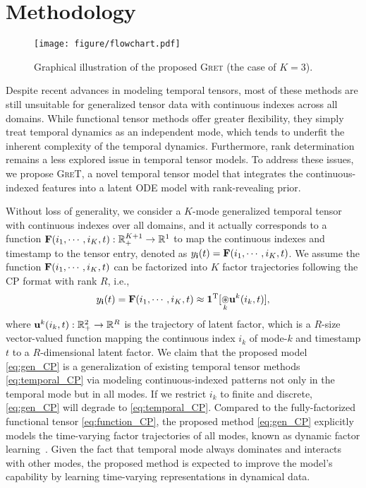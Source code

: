\section{Methodology}
\begin{figure*}
    \centering
    \texttt{[image: figure/flowchart.pdf]}
    \caption{Graphical illustration of the proposed \textsc{Gret} (the case of $K=3$).}
    \label{fig:flowchart}
    \vspace{-0.05in}
\end{figure*}
Despite recent advances in modeling temporal tensors, most of these methods are still unsuitable for generalized tensor data with continuous indexes across all domains. 
While functional tensor methods offer greater flexibility, they simply treat temporal dynamics as an independent mode, which tends to underfit the inherent complexity of the temporal dynamics.  Furthermore, rank determination remains a less explored issue in temporal tensor models.
To address these issues, we propose \textsc{GreT}, a novel temporal tensor model that integrates the continuous-indexed  features into a latent ODE  model with rank-revealing prior. 

Without loss of generality, we consider a $K$-mode generalized temporal tensor  with continuous indexes over all domains, and it actually corresponds to a function $\mathbf{F}(i_1, \cdots, i_K, t):\mathbb{R}_{+}^{K+1}\rightarrow \mathbb{R}^{1}$ to map the continuous indexes and timestamp to the tensor entry, denoted as $y_{\mathbf{i}}(t) = \mathbf{F}(i_1, \cdots, i_K, t)$. We assume the function $\mathbf{F}(i_1, \cdots, i_K, t)$ can be factorized into $K$  factor trajectories following the CP format with rank $R$, i.e., 
\vspace{-2mm}
\begin{equation}    
    y_{\mathbf{i}}(t) = \mathbf{F}(i_1, \cdots, i_K, t) \approx \boldsymbol{1}^{\mathrm{T}}[\underset{k}{\circledast}  \mathbf{u}^k(i_k, t)], \label{eq:gen_CP}
\end{equation}
where $\mathbf{u}^k(i_k, t):\mathbb{R}_{+}^{2}\rightarrow \mathbb{R}^{R}$  is the trajectory of latent factor, which is a $R$-size vector-valued function mapping the continuous index $i_k$ of mode-$k$ and timestamp $t$ to a $R$-dimensional latent factor. We claim that the proposed model \eqref{eq:gen_CP} is a generalization of existing temporal tensor methods \eqref{eq:temporal_CP} via modeling continuous-indexed patterns not only in the temporal mode but in all modes. If we restrict $i_k$ to finite and discrete, \eqref{eq:gen_CP} will degrade to \eqref{eq:temporal_CP}. Compared to the fully-factorized functional tensor \eqref{eq:function_CP}, the proposed method \eqref{eq:gen_CP} explicitly models the time-varying factor trajectories of all modes, known as dynamic factor learning~\citep{SFTL,NONFAT}. Given the fact that temporal mode always dominates and interacts with other modes, the proposed method is expected to improve the model's capability by learning time-varying representations in dynamical data.

